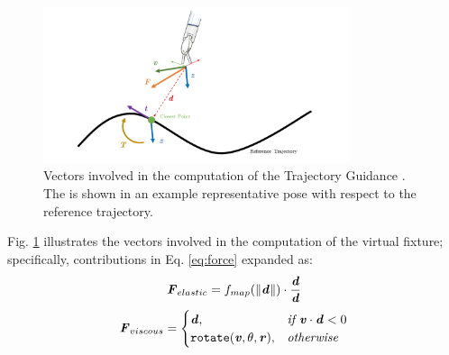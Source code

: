 \documentclass[../main.tex]{subfiles}
\begin{document}
\begin{figure}
    \centering
    \includegraphics[width=0.8\textwidth]{images/trajectory_guidance.png}
    \caption{Vectors involved in the computation of the Trajectory Guidance \vf. The \psm is shown in an example representative pose with respect to the reference trajectory.}
    \label{fig:trajectoryguidance}
\end{figure}

Fig. \ref{fig:trajectoryguidance} illustrates the vectors involved in the computation of the virtual fixture; specifically, contributions in Eq. \ref{eq:force} expanded as:
\begin{equation}
    \textbf{\textit{F}}_{elastic} = f_{map}(\|\textbf{\textit{d}}\|)\cdot\frac{\textbf{\textit{d}}}{\textbf{\textit{d}}}
\end{equation} 
\begin{equation}
    \textbf{\textit{F}}_{viscous} = 
    \begin{cases} 
        \textbf{\textit{d}}, & \textit{if         } \textbf{\textit{v}}\cdot\textbf{\textit{d}}<0 \\
         \texttt{rotate}(\textbf{\textit{v}},\theta,\textbf{\textit{r}}), & \textit{otherwise}
    \end{cases}
\end{equation} 
\end{document}
